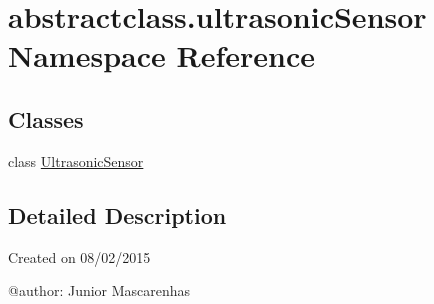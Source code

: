 \hypertarget{namespaceabstractclass_1_1ultrasonicSensor}{}\section{abstractclass.\+ultrasonic\+Sensor Namespace Reference}
\label{namespaceabstractclass_1_1ultrasonicSensor}
\subsection*{Classes}
\begin{DoxyCompactItemize}
\item 
class \hyperlink{classabstractclass_1_1ultrasonicSensor_1_1UltrasonicSensor}{Ultrasonic\+Sensor}
\end{DoxyCompactItemize}


\subsection{Detailed Description}
\begin{DoxyVerb}Created on 08/02/2015

@author: Junior Mascarenhas
\end{DoxyVerb}
 